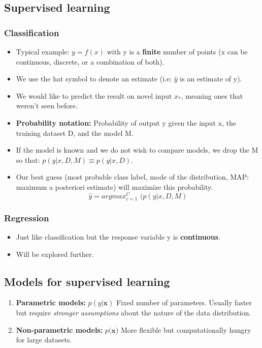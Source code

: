 \documentclass[a4paper,11pt]{article}
\begin{document}
\subsection{Supervised learning}
\subsubsection{Classification}
\begin{itemize}
	\item Typical example: $y=f(x)$ with y is a \textbf{finite} number of points (x can be continuous, discrete, or a combination of both).
	\item We use the hat symbol to denote an estimate (i.e: $\hat{y}$ is an estimate of y).
	\item We would like to predict the result on novel input $x_*$, meaning ones that weren't seen before.
	\item \textbf{Probability notation:} Probability of output y given the input x, the training dataset D, and the model M.

	 \item If the model is known and we do not wish to compare models, we drop the M so that: $p(y | x, D, M) \equiv p(y | x, D)$.
	 \item Our best guess (most probable class label, mode of the distribution, MAP: maximum a posteriori estimate) will maximize this probability.
	\[
	\hat{y}=argmax^C_{c=1} \, \, (p(y | x, D, M)
	\]
\end{itemize}

\subsubsection{Regression}
\begin{itemize}
	\item Just like classification but the response variable y is \textbf{continuous}.
	\item Will be explored further.
\end{itemize}
\subsection{Models for supervised learning}
\begin{enumerate}
	\item \textbf{Parametric models:} $p(y | \mathbf{x})$ Fixed number of parameters. Usually faster but require \emph{stronger assumptions} about the nature of the data distribution.
	\item \textbf{Non-parametric models:} $p(\mathbf{x)}$ More flexible but computationally hungry for large datasets.
\end{enumerate}
\end{document}
